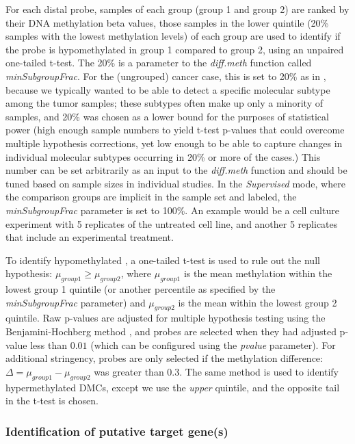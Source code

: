 For each distal probe, samples of each group (group 1 and group 2) are ranked by
their DNA methylation beta values, those samples in the lower quintile (20\% samples
with the lowest methylation levels) of each group are used to identify if the probe is
hypomethylated in group 1 compared to group 2, using an unpaired one-tailed t-test.
The 20\% is a parameter to the \textit{diff.meth} function called \textit{minSubgroupFrac}. For the (ungrouped) cancer case, this is set to 20\% as in , because we typically wanted to be able to detect a specific molecular subtype among the tumor samples; these subtypes often make up only a
minority of samples, and 20\% was chosen as a lower bound for the purposes of
statistical power (high enough sample numbers to yield t-test p-values that could
overcome multiple hypothesis corrections, yet low enough to be able to capture
changes in individual molecular subtypes occurring in 20\% or more of the cases.)
This number can be set arbitrarily as an input to the \textit{diff.meth} function
and should be tuned based on sample sizes in individual studies. In the \textit{Supervised} mode,
where the comparison groups are implicit in the sample set and labeled,
the \textit{minSubgroupFrac} parameter is set to 100\%.
An example would be a cell culture experiment with 5 replicates of the untreated cell line,
and another 5 replicates that include an experimental treatment.

To identify hypomethylated ,
a one-tailed t-test is used to rule out the null hypothesis:
$\mu_{group1} \geq \mu_{group2}$, where $\mu_{group1}$ is the
mean methylation within the lowest group 1 quintile (or another percentile
as specified by the \textit{minSubgroupFrac} parameter) and $\mu_{group2}$
is the mean within the lowest group 2 quintile. Raw p-values are adjusted
for multiple hypothesis testing using the Benjamini-Hochberg method
\cite{benjamini1995controlling}, and probes are selected when they had
adjusted p-value less than $0.01$ (which can be configured using
the \textit{pvalue} parameter). For additional stringency, probes are only
selected if the methylation difference: $\Delta = \mu_{group1} - \mu_{group2}$
was greater than $0.3$. The same method is used to identify hypermethylated DMCs,
except we use the \textit{upper} quintile, and the opposite tail in the t-test is chosen.

\subsubsection*{Identification of putative target gene(s)}

